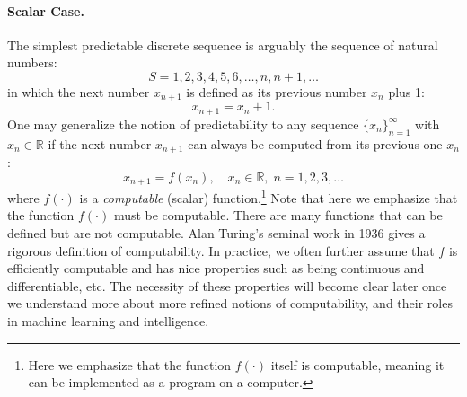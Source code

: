 \documentclass[../../book-main.tex]{subfiles}
\begin{document}
\paragraph{Scalar Case.} The simplest predictable discrete sequence is arguably the sequence of natural numbers:
\begin{equation}
   {S} =  1, 2, 3, 4, 5, 6, \ldots, n, n+1, \ldots
\end{equation}
in which the next number $x_{n+1}$ is defined as its previous number $x_n$ plus 1:
\begin{equation}
x_{n+1} = x_n + 1.    
\end{equation}
One may generalize the notion of predictability to any sequence $\{x_n\}_{n=1}^\infty$ with $ x_n \in \mathbb{R}$ if the next number $x_{n+1}$ can always be computed from its previous one $x_n$:
\begin{equation}
    x_{n+1} = f(x_{n}), \quad x_n \in \mathbb{R}, \; n =  1, 2, 3, \ldots
\end{equation}
where $f(\cdot)$ is a {\em computable} (scalar) function.\footnote{Here we emphasize that the function $f(\cdot)$ itself is computable, meaning it can be implemented as a program on a computer. } Note that here we emphasize that the function $f(\cdot)$ must be computable. There are many functions that can be defined but are not computable. Alan Turing's seminal work in 1936 \cite{Turing-1936} gives a rigorous definition of computability. In practice, we often further assume that $f$ is efficiently computable and has nice properties such as being continuous and differentiable, etc. The necessity of these properties will become clear later once we understand more about more refined notions of computability, and their roles in machine learning and intelligence.
\end{document}
